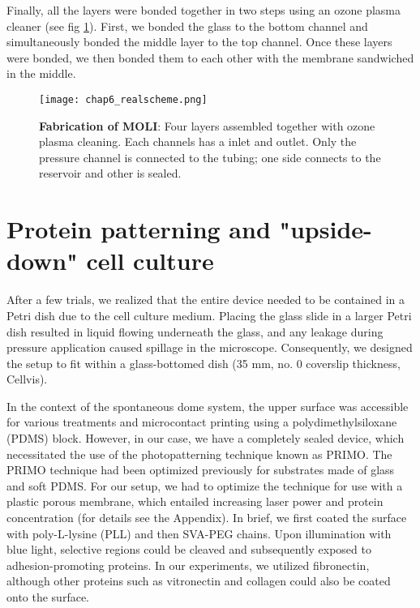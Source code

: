 Finally, all the layers were bonded together in two steps using an ozone plasma cleaner (see fig \ref{fig_6_2}). First, we bonded the glass to the bottom channel and simultaneously bonded the middle layer to the top channel. Once these layers were bonded, we then bonded them to each other with the membrane sandwiched in the middle.

\begin{figure}[h!]
	\centering
	\texttt{[image: chap6\_realscheme.png]}
	\caption{ \textbf{Fabrication of MOLI}: Four layers assembled together with ozone plasma cleaning. Each channels has a inlet and outlet. Only the pressure channel is connected to the tubing; one side connects to the reservoir and other is sealed. 
	}\label{fig_6_2}
\end{figure}

\hypertarget{protein-patterning-and-inverted-cell-culture}{%
\section{Protein patterning and "upside-down" cell
culture}\label{protein-patterning-and-inverted-cell-culture}}

After a few trials, we realized that the entire device needed to be contained in a Petri dish due to the cell culture medium. Placing the glass slide in a larger Petri dish resulted in liquid flowing underneath the glass, and any leakage during pressure application caused spillage in the microscope. Consequently, we designed the setup to fit within a glass-bottomed dish (35 mm, no. 0 coverslip thickness, Cellvis).  

In the context of the spontaneous dome system, the upper surface was accessible for various treatments and microcontact printing using a polydimethylsiloxane (PDMS) block. However, in our case, we have a completely sealed device, which necessitated the use of the photopatterning technique known as PRIMO. The PRIMO technique had been optimized previously for substrates made of glass and soft PDMS. For our setup, we had to optimize the technique for use with a plastic porous membrane, which entailed increasing laser power and protein concentration (for details see the Appendix). In brief, we first coated the surface with poly-L-lysine (PLL) and then SVA-PEG chains. Upon illumination with blue light, selective regions could be cleaved and subsequently exposed to adhesion-promoting proteins. In our experiments, we utilized fibronectin, although other proteins such as vitronectin and collagen could also be coated onto the surface.

